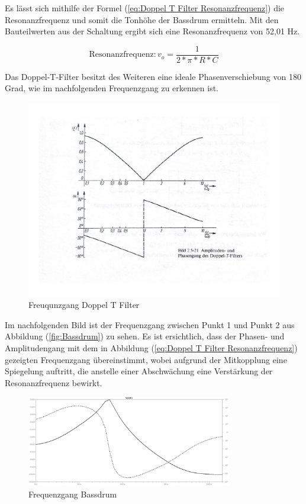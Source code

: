 Es lässt sich mithilfe der Formel (\ref{eq:Doppel T Filter Resonanzfrequenz}) die Resonanzfrequenz und somit die Tonhöhe der Bassdrum ermitteln. Mit den Bauteilwerten aus der Schaltung ergibt sich eine Resonanzfrequenz von 52,01 Hz.

\begin{equation}
   \text{Resonanzfrequenz} : v_o=\frac{1}{2*\pi*R*C}
    \label{eq:Doppel T Filter Resonanzfrequenz}
\end{equation}

Das Doppel-T-Filter besitzt des Weiteren eine ideale Phasenverschiebung von 180 Grad, wie im nachfolgenden Frequenzgang zu erkennen ist.
\begin{figure}[H]
    \centering
    \includegraphics[width=1\textwidth]{Images/frequenzgang doppel t.jpg}
    \caption[Freuqunzgang Doppel T Filter]{Freuqunzgang Doppel T Filter \cite[s.41]{Bystron}}
    \label{fig:Freuqunzgang Doppel T Filter}
\end{figure}

Im nachfolgenden Bild ist der Frequenzgang zwischen Punkt 1 und Punkt 2 aus Abbildung (\ref{fig:Bassdrum}) zu sehen. Es ist ersichtlich, dass der Phasen- und Amplitudengang mit dem in Abbildung (\ref{eq:Doppel T Filter Resonanzfrequenz}) gezeigten Frequenzgang übereinstimmt, wobei aufgrund der Mitkopplung eine Spiegelung auftritt, die anstelle einer Abschwächung eine Verstärkung der Resonanzfrequenz bewirkt.

\begin{figure}[H]
    \centering
    \includegraphics[width=0.8\textwidth]{Images/Frequenzgang Bassdrum.jpg}
    \caption[Frequenzgang Bassdrum]{Frequenzgang Bassdrum}
    \label{fig:Frequenzgang Bassdrum}
\end{figure}


